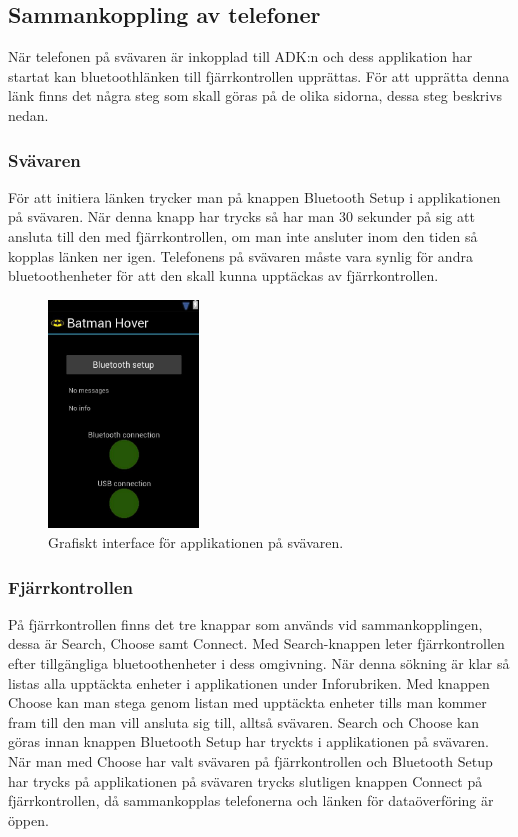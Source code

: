\subsection{Sammankoppling av telefoner}

När telefonen på svävaren är inkopplad till ADK:n och dess applikation har startat kan
bluetoothlänken till fjärrkontrollen upprättas. För att upprätta denna länk finns det några steg som skall göras på de olika sidorna, dessa steg beskrivs nedan.

\subsubsection{Svävaren}

För att initiera länken trycker man på knappen Bluetooth Setup i applikationen på svävaren.
När denna knapp har trycks så har man 30 sekunder på sig att ansluta till den med fjärrkontrollen, om man inte ansluter inom den tiden så kopplas länken ner igen.
Telefonens på svävaren måste vara synlig för andra bluetoothenheter för att den skall kunna upptäckas av fjärrkontrollen.

\begin{figure}[htbp!]
\centering
\includegraphics[width=4cm]{../../includes/figures/hoverApp.png}
\caption{Grafiskt interface för applikationen på svävaren.}
\label{fig:hoverApp}
\end{figure}


\subsubsection{Fjärrkontrollen}

På fjärrkontrollen finns det tre knappar som används vid sammankopplingen, dessa är Search, Choose samt Connect. Med Search-knappen leter fjärrkontrollen efter tillgängliga bluetoothenheter i dess omgivning. När denna sökning är klar så listas alla upptäckta enheter i applikationen under Inforubriken. Med knappen Choose kan man stega genom listan med upptäckta enheter tills man kommer fram till den man vill ansluta sig till, alltså svävaren.
Search och Choose kan göras innan knappen Bluetooth Setup har tryckts i applikationen på svävaren. När man med Choose har valt svävaren på fjärrkontrollen och Bluetooth Setup har trycks på applikationen på svävaren trycks slutligen knappen Connect på fjärrkontrollen, då sammankopplas telefonerna och länken för dataöverföring är öppen.

